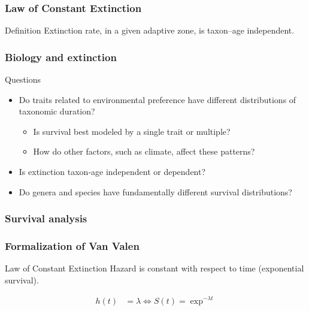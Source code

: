 \documentclass{beamer}
\begin{document}
\begin{frame}
  \frametitle{Law of Constant Extinction}

  \begin{alertblock}{Definition}
    Extinction rate, in a given adaptive zone, is taxon--age independent.

    \tiny{}
  \end{alertblock}
\end{frame}

\begin{frame}
  \frametitle{Biology and extinction}

  \begin{block}{Questions}
    \begin{itemize}
      \item Do traits related to environmental preference have different distributions of taxonomic duration? 
        \begin{itemize}
          \item Is survival best modeled by a single trait or multiple? 
          \item How do other factors, such as climate, affect these patterns? 
        \end{itemize}
      \item Is extinction taxon-age independent or dependent?
      \item Do genera and species have fundamentally different survival distributions?
    \end{itemize}
  \end{block}
\end{frame}

\begin{frame}
  \frametitle{Survival analysis}
\end{frame}

\begin{frame}
  \frametitle{Formalization of Van Valen}
  \begin{block}{Law of Constant Extinction}
    Hazard is constant with respect to time (\alert{exponential survival}).
  \end{block}

    \begin{align*}
      h(t) &= \lambda \iff S(t) = \exp^{-\lambda t}
    \end{align*}
\end{frame}
\end{document}
